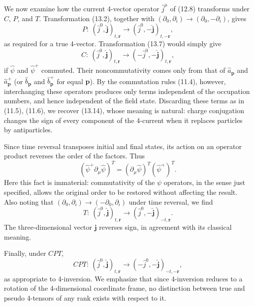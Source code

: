 We now examine how the current 4-vector operator $\widehat j^\mu$ of (12.8) transforms under $C$, $P$, and $T$. Transformation (13.2), together with $(\partial_0,\partial_i)\to(\partial_0,-\partial_i)$, gives
\begin{equation}
P:\ (\widehat j^0,\widehat{\mathbf j})_{t,\mathbf r}
\to(\widehat j^0,-\widehat{\mathbf j})_{t,-\mathbf r},
\tag{13.13}
\end{equation}
as required for a true 4-vector. Transformation (13.7) would simply give
\begin{equation}
C:\ (\widehat j^0,\widehat{\mathbf j})_{t,\mathbf r}
\to(-\widehat j^0,-\widehat{\mathbf j})_{t,\mathbf r},
\tag{13.14}
\end{equation}
if $\widehat\psi$ and $\widehat\psi^+$ commuted. Their noncommutativity comes only from that of $\widehat a_{\mathbf p}$ and $\widehat a^+_{\mathbf p}$ (or $\widehat b_{\mathbf p}$ and $\widehat b^+_{\mathbf p}$ for equal $\mathbf p$). By the commutation rules (11.4), however, interchanging these operators produces only terms independent of the occupation numbers, and hence independent of the field state. Discarding these terms as in (11.5), (11.6), we recover (13.14), whose meaning is natural: charge conjugation changes the sign of every component of the 4-current when it replaces particles by antiparticles.

Since time reversal transposes initial and final states, its action on an operator product reverses the order of the factors. Thus
\[
(\widehat\psi^+\partial_\mu\widehat\psi)^T
=(\partial_\mu\widehat\psi)^T(\widehat\psi^+)^T.
\]
Here this fact is immaterial: commutativity of the $\psi$ operators, in the sense just specified, allows the original order to be restored without affecting the result. Also noting that $(\partial_0,\partial_i)\to(-\partial_0,\partial_i)$ under time reversal, we find
\begin{equation}
T:\ (\widehat j^0,\widehat{\mathbf j})_{t,\mathbf r}
\to(\widehat j^0,-\widehat{\mathbf j})_{-t,\mathbf r}.
\tag{13.15}
\end{equation}
The three-dimensional vector $\mathbf j$ reverses sign, in agreement with its classical meaning.

Finally, under $CPT$,
\begin{equation}
CPT:\ (\widehat j^0,\widehat{\mathbf j})_{t,\mathbf r}
\to(-\widehat j^0,-\widehat{\mathbf j})_{-t,-\mathbf r},
\tag{13.16}
\end{equation}
as appropriate to 4-inversion. We emphasize that since 4-inversion reduces to a rotation of the 4-dimensional coordinate frame, no distinction between true and pseudo 4-tensors of any rank exists with respect to it.

